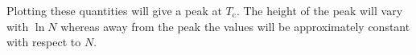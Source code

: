 \documentclass[fleqn]{NotesClass}
\begin{document}
    Plotting these quantities will give a peak at \(T_{\mathrm{c}}\).
    The height of the peak will vary with \(\ln N\) whereas away from the peak the values will be approximately constant with respect to \(N\).
    
    
%        

\backmatter
\renewcommand{\glossaryname}{Acronyms}
\printglossary[acronym]
\printindex
\end{document}
